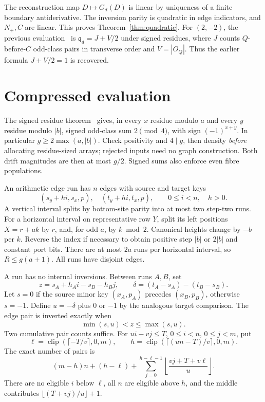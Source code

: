 \documentclass[11pt]{article}
\newcommand{\qd}{\mathfrak q_d}
\newcommand{\clip}{\operatorname{clip}}
\begin{document}
The reconstruction map $D\mapsto G_d(D)$ is linear by uniqueness of a finite
boundary antiderivative. The inversion parity is quadratic in edge indicators,
and $N_+,C$ are linear. This proves Theorem~\ref{thm:quadratic}.
For $(2,-2)$, the previous evaluation~\cite{M} is
$\qd=J+V/2$ under signed residues, where $J$ counts $Q$-before-$C$ odd-class pairs
in transverse order and $V=|O_Q|$. Thus the earlier formula $J+V/2=1$ is recovered.

\section{Compressed evaluation}\label{sec:algorithm}
The signed residue theorem~\cite{J} gives, in every $x$ residue modulo $a$ and
every $y$ residue modulo $|b|$, signed odd-class sum $2\pmod4$, with sign
$(-1)^{x+y}$. In particular $g\ge2\max(a,|b|)$.
Check positivity and $4\mid g$, then density \emph{before} allocating residue-sized
arrays; rejected inputs need no graph construction. Both drift magnitudes are
then at most $g/2$. Signed sums also enforce even fibre populations.

An arithmetic edge run has $n$ edges with source and target keys
\begin{equation}
 (s_y+hi,s_x,p),\quad (t_y+hi,t_x,p),\qquad 0\le i<n,\quad h>0.
 \label{eq:run}
\end{equation}
A vertical interval splits by bottom-site parity into at most two step-two runs.
For a horizontal interval on representative row $Y$, split its left positions
$X=r+ak$ by $r$, and, for odd $a$, by $k\bmod2$. Canonical heights change by
$-b$ per $k$. Reverse the index if necessary to obtain positive step $|b|$ or
$2|b|$ and constant port bits. There are at most $2a$ runs per horizontal interval,
so $R\le g(a+1)$. All runs have disjoint edges.

A run has no internal inversions. Between runs $A,B$, set
\[
 z=s_A+h_Ai-s_B-h_Bj,\qquad
 \delta=(t_A-s_A)-(t_B-s_B).
\]
Let $s=0$ if the source minor key $(x_A,p_A)$ precedes $(x_B,p_B)$, otherwise
$s=-1$. Define $u=-\delta$ plus $0$ or $-1$ by the analogous target comparison.
The edge pair is inverted exactly when
\begin{equation}
 \min(s,u)<z\le\max(s,u).\label{eq:inversion-range}
\end{equation}
Two cumulative pair counts suffice. For
$ui-vj\le T$, $0\le i<n$, $0\le j<m$, put
\[
 \ell=\clip(\lceil-T/v\rceil,0,m),\qquad
 h=\clip(\lceil(un-T)/v\rceil,0,m).
\]
The exact number of pairs is
\begin{equation}
 (m-h)n+(h-\ell)+
 \sum_{j=0}^{h-\ell-1}\left\lfloor\frac{vj+T+v\ell}{u}\right\rfloor.
 \label{eq:pairs}
\end{equation}
There are no eligible $i$ below $\ell$, all $n$ are eligible above $h$, and the
middle contributes $\lfloor(T+vj)/u\rfloor+1$.
\end{document}
